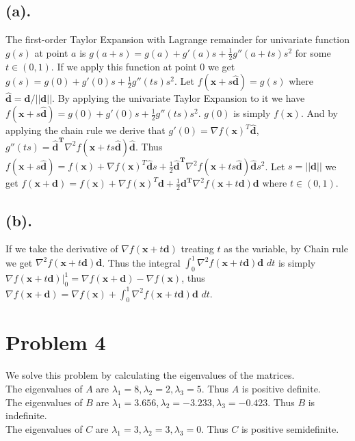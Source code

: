 \documentclass[12pt,letterpaper]{article}
\begin{document}
\subsection*{(a).}
The first-order Taylor Expansion with Lagrange remainder for univariate function $g(s)$ at point $a$ is $g(a+s)=g(a)+g'(a)s+\frac{1}{2}g''(a+ts)s^{2}$ for some $t\in (0,1)$. If we apply this function at point $0$ we get $g(s)=g(0)+g'(0)s+\frac{1}{2}g''(ts)s^{2}$. Let $f(\boldsymbol{x}+s\boldsymbol{\hat{d}})=g(s)$ where $\boldsymbol{\hat{d}}=\boldsymbol{d}/||\boldsymbol{d}||$. By applying the univariate Taylor Expansion to it we have $f(\boldsymbol{x}+s\boldsymbol{\hat{d}})=g(0)+g'(0)s+\frac{1}{2}g''(ts)s^{2}$. $g(0)$ is simply $f(\boldsymbol{x})$. And by applying the chain rule we derive that $g'(0)=\nabla f(\boldsymbol{x})^T\boldsymbol{\hat{d}}$, $g''(ts)=\boldsymbol{\hat{d}^T}\nabla^2f(\boldsymbol{x}+ts\boldsymbol{\hat{d}})\boldsymbol{\hat{d}}$. Thus $f(\boldsymbol{x}+s\boldsymbol{\hat{d}})=f(\boldsymbol{x})+\nabla f(\boldsymbol{x})^T\boldsymbol{\hat{d}}s+\frac{1}{2}\boldsymbol{\hat{d}^T}\nabla^2f(\boldsymbol{x}+ts\boldsymbol{\hat{d}})\boldsymbol{\hat{d}}s^2$. Let $s=||\boldsymbol{d}||$ we get $f(\boldsymbol{x}+\boldsymbol{d})=f(\boldsymbol{x})+\nabla f(\boldsymbol{x})^T\boldsymbol{d}+\frac{1}{2}\boldsymbol{d^T}\nabla^2f(\boldsymbol{x}+t\boldsymbol{d})\boldsymbol{d}$ where $t \in (0,1)$.
\subsection*{(b).}
If we take the derivative of $\nabla f(\boldsymbol{x}+t\boldsymbol{d})$ treating $t$ as the variable, by Chain rule we get $\nabla^2 f(\boldsymbol{x}+t\boldsymbol{d})\boldsymbol{d}$. Thus the integral $\int_{0}^{1}\nabla^2 f(\boldsymbol{x}+t\boldsymbol{d})\boldsymbol{d}$ $dt$ is simply $\nabla f(\boldsymbol{x}+t\boldsymbol{d})|_{0}^{1}=\nabla f(\boldsymbol{x}+\boldsymbol{d})-\nabla f(\boldsymbol{x})$, thus $\nabla f(\boldsymbol{x}+\boldsymbol{d})=\nabla f(\boldsymbol{x})+\int_{0}^{1}\nabla^2 f(\boldsymbol{x}+t\boldsymbol{d})\boldsymbol{d}$ $dt$.

\section*{Problem 4}
We solve this problem by calculating the eigenvalues of the matrices.\\
The eigenvalues of $A$ are $\lambda_1=8, \lambda_2=2, \lambda_3=5$. Thus $A$ is positive definite.\\
The eigenvalues of $B$ are $\lambda_1=3.656, \lambda_2=-3.233, \lambda_3=-0.423$. Thus $B$ is indefinite.\\
The eigenvalues of $C$ are $\lambda_1=3, \lambda_2=3, \lambda_3=0$. Thus $C$ is positive semidefinite.
\end{document}
